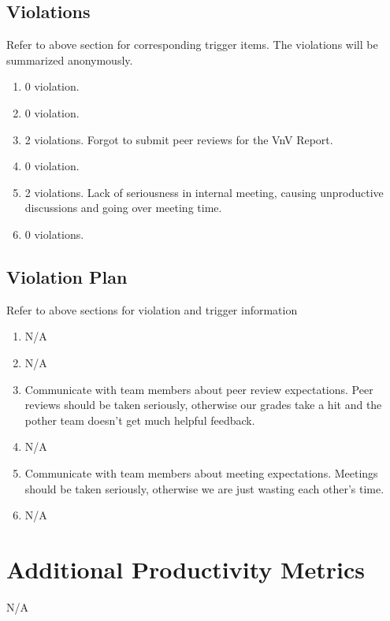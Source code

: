 \documentclass{article}
\begin{document}
\subsection{Violations}

\par{Refer to above section for corresponding trigger items. The violations will
be summarized anonymously.}
\begin{enumerate}
    \item{0 violation.}
    \item{0 violation.}
    \item{2 violations. Forgot to submit peer reviews for the VnV Report.}
    \item{0 violation.}
    \item{2 violations. Lack of seriousness in internal meeting, causing unproductive discussions and going over meeting time.}
    \item{0 violations.}
\end{enumerate}

\subsection{Violation Plan}

\par{Refer to above sections for violation and trigger information}

\begin{enumerate}
    \item{N/A}
    \item{N/A}
    \item{Communicate with team members about peer review expectations. Peer reviews should be taken seriously, otherwise our grades take a hit and the pother team doesn't get much helpful feedback.}
    \item{N/A}
    \item{Communicate with team members about meeting expectations. Meetings should be taken seriously,
    otherwise we are just wasting each other's time.}
    \item{N/A}
\end{enumerate}

\section{Additional Productivity Metrics}

N/A
\end{document}
